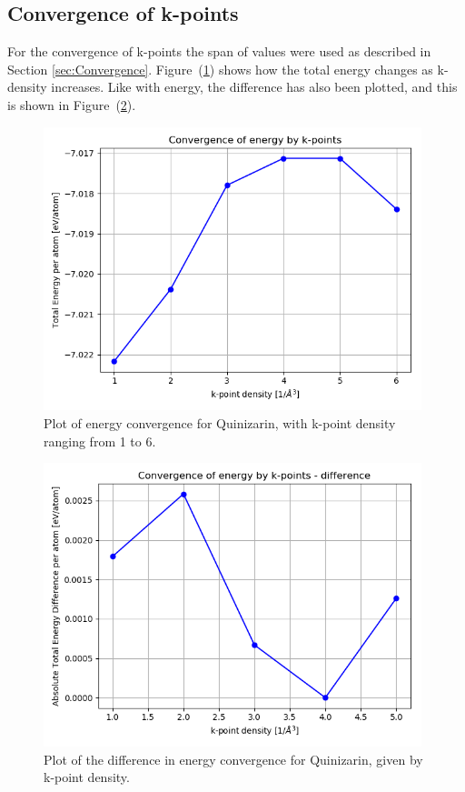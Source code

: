 \documentclass{article}
\begin{document}
    \vspace{1cm}

  \subsection{Convergence of k-points}

    For the convergence of k-points the span of values were used as described in Section \ref{sec:Convergence}. Figure~(\ref{fig:convergence_kpoints}) shows how the total energy changes as k-density increases. Like with energy, the difference has also been plotted, and this is shown in Figure~(\ref{fig:convergence_kpoints_difference}).

    \begin{figure}[H]
        \centering
        \includegraphics[width = 11cm]{../fig/convergence_kpoints.png}
        \caption{Plot of energy convergence for Quinizarin, with k-point density ranging from 1 to 6. }
        \label{fig:convergence_kpoints}
    \end{figure}

    \begin{figure}[H]
        \centering
        \includegraphics[width = 11cm]{../fig/convergence_kpoints_difference.png}
        \caption{Plot of the difference in energy convergence for Quinizarin, given by k-point density. }
        \label{fig:convergence_kpoints_difference}
    \end{figure}
\end{document}
